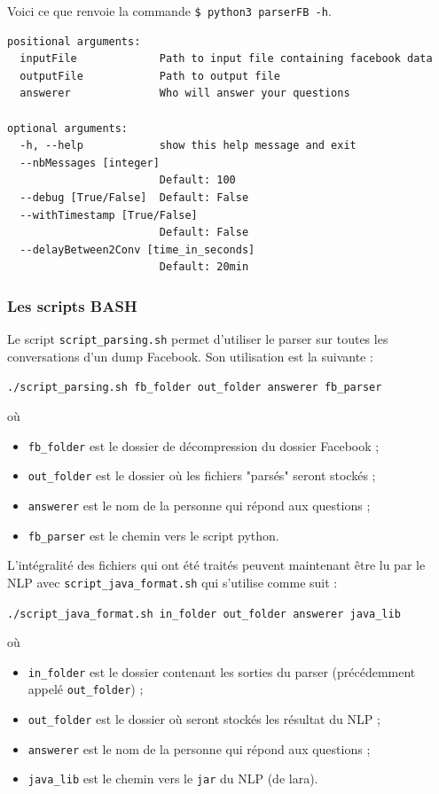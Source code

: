 \documentclass[10pt,a4paper]{article}
\begin{document}
Voici ce que renvoie la commande \texttt{\$ python3 parserFB -h}.

\begin{verbatim}
positional arguments:
  inputFile             Path to input file containing facebook data
  outputFile            Path to output file
  answerer              Who will answer your questions

optional arguments:
  -h, --help            show this help message and exit
  --nbMessages [integer]
                        Default: 100
  --debug [True/False]  Default: False
  --withTimestamp [True/False]
                        Default: False
  --delayBetween2Conv [time_in_seconds]
                        Default: 20min

\end{verbatim}
\subsubsection{Les scripts BASH}
Le script \texttt{script\_parsing.sh} permet d'utiliser le parser sur toutes les conversations d'un dump Facebook. Son utilisation est la suivante :
\begin{center}
\texttt{./script\_parsing.sh fb\_folder out\_folder answerer fb\_parser}
\end{center}
où
\begin{itemize}
\item \texttt{fb\_folder} est le dossier de décompression du dossier Facebook ;
\item \texttt{out\_folder} est le dossier où les fichiers "parsés" seront stockés ;
\item \texttt{answerer} est le nom de la personne qui répond aux questions ;
\item \texttt{fb\_parser} est le chemin vers le script python.
\end{itemize}
L'intégralité des fichiers qui ont été traités peuvent maintenant être lu par le NLP avec \texttt{script\_java\_format.sh} qui s'utilise comme suit :
\begin{center}
\texttt{./script\_java\_format.sh in\_folder out\_folder answerer java\_lib}
\end{center}
où
\begin{itemize}
\item \texttt{in\_folder} est le dossier contenant les sorties du parser (précédemment appelé \texttt{out\_folder}) ;
\item \texttt{out\_folder} est le dossier où seront stockés les résultat du NLP ; 
\item \texttt{answerer} est le nom de la personne qui répond aux questions ;
\item \texttt{java\_lib} est le chemin vers le \texttt{jar} du NLP (de lara).
\end{itemize}
\end{document}
